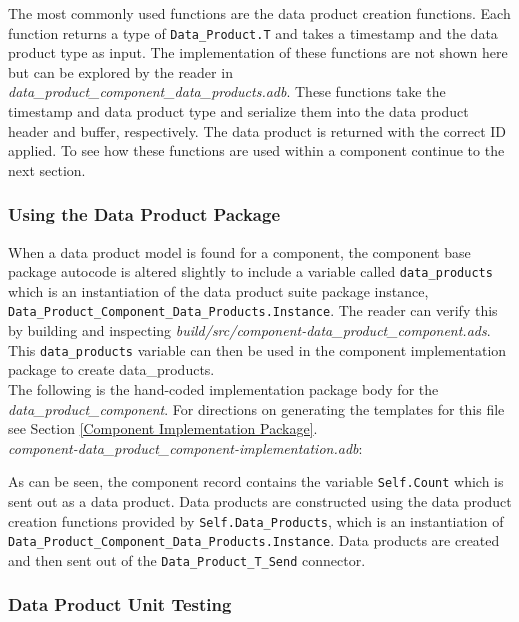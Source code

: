 The most commonly used functions are the data product creation functions. Each function returns a type of \texttt{Data\_Product.T} and takes a timestamp and the data product type as input. The implementation of these functions are not shown here but can be explored by the reader in \textit{data\_product\_component\_data\_products.adb}. These functions take the timestamp and data product type and serialize them into the data product header and buffer, respectively. The data product is returned with the correct ID applied. To see how these functions are used within a component continue to the next section.

\subsubsection{Using the Data Product Package}

When a data product model is found for a component, the component base package autocode is altered slightly to include a variable called \texttt{data\_products} which is an instantiation of the data product suite package instance, \texttt{Data\_Product\_Component\_Data\_Products.Instance}. The reader can verify this by building and inspecting \textit{build/src/component-data\_product\_component.ads}. This \texttt{data\_products} variable can then be used in the component implementation package to create data\_products. \\

The following is the hand-coded implementation package body for the \textit{data\_product\_component}. For directions on generating the templates for this file see Section \ref{Component Implementation Package}. \\

\textit{component-data\_product\_component-implementation.adb}:

As can be seen, the component record contains the variable \texttt{Self.Count} which is sent out as a data product. Data products are constructed using the data product creation functions provided by \texttt{Self.Data\_Products}, which is an instantiation of \texttt{Data\_Product\_Component\_Data\_Products.Instance}. Data products are created and then sent out of the \texttt{Data\_Product\_T\_Send} connector.

\subsubsection{Data Product Unit Testing}

